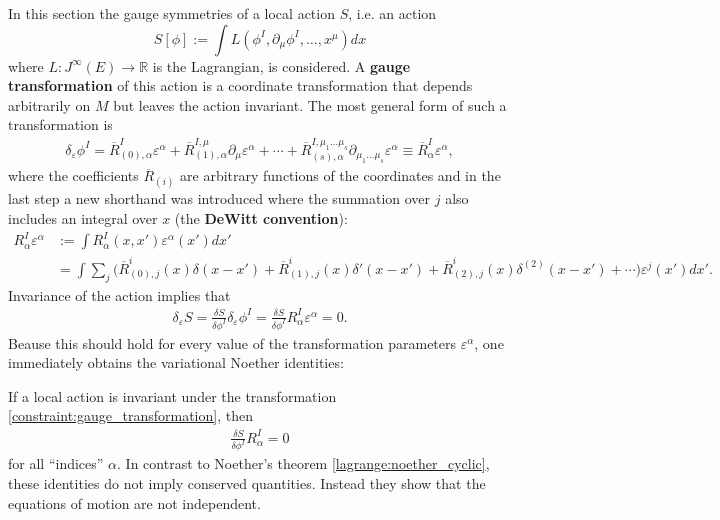     In this section the gauge symmetries of a local action $S$, i.e. an action \[S[\phi] := \int L(\phi^I,\partial_\mu\phi^I,\ldots,x^\mu) dx\] where $L:J^\infty(E)\rightarrow\mathbb{R}$ is the Lagrangian, is considered. A \textbf{gauge transformation} of this action is a coordinate transformation that depends arbitrarily on $M$ but leaves the action invariant. The most general form of such a transformation is
    \begin{gather}
        \label{constraint:gauge_transformation}
        \delta_\varepsilon\phi^I = \overline{R}^I_{(0),\alpha}\varepsilon^\alpha + \overline{R}^{I,\mu}_{(1),\alpha}\partial_\mu\varepsilon^\alpha + \cdots + \overline{R}^{I,\mu_1\ldots\mu_s}_{(s),\alpha}\partial_{\mu_1\ldots\mu_s}\varepsilon^\alpha\equiv \overline{R}^I_\alpha\varepsilon^\alpha,
    \end{gather}
    where the coefficients $\overline{R}_{(i)}$ are arbitrary functions of the coordinates and in the last step a new shorthand was introduced where the summation over $j$ also includes an integral over $x$ (the \textbf{DeWitt convention}):
    \begin{align}
        R^I_\alpha\varepsilon^\alpha &:= \int R^I_\alpha(x,x')\varepsilon^\alpha(x')dx'\\
        &= \int\sum_j\Big(\overline{R}^i_{(0),j}(x)\delta(x-x')+\overline{R}^i_{(1),j}(x)\delta'(x-x')+\overline{R}^i_{(2),j}(x)\delta^{(2)}(x-x')+\cdots\Big)\varepsilon^j(x')dx'.\nonumber
    \end{align}
    Invariance of the action implies that
    \begin{gather}
        \delta_\varepsilon S = \frac{\delta S}{\delta\phi^I}\delta_\varepsilon\phi^I = \frac{\delta S}{\delta\phi^I}R^I_\alpha\varepsilon^\alpha = 0.
    \end{gather}
    Beause this should hold for every value of the transformation parameters $\varepsilon^\alpha$, one immediately obtains the variational Noether identities:
    \begin{property}\label{field:noether_identity}
        If a local action is invariant under the transformation \eqref{constraint:gauge_transformation}, then
        \begin{gather}
            \frac{\delta S}{\delta\phi^I}R^I_\alpha = 0
        \end{gather}
        for all ``indices'' $\alpha$. In contrast to Noether's theorem \ref{lagrange:noether_cyclic}, these identities do not imply conserved quantities. Instead they show that the equations of motion are not independent.
    \end{property}
